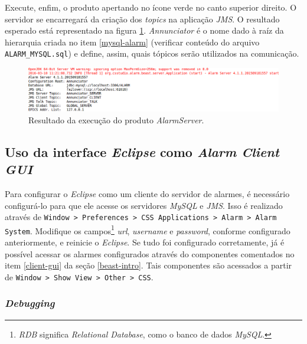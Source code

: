 \begin{enumerate}[i.]
\FloatBarrier

Execute, enfim, o produto apertando no ícone verde no canto superior direito.
O servidor se encarregará da criação dos \textit{topics} na aplicação
\textit{JMS}. O resultado esperado está representado na figura
\ref{fig:server-on}. \textit{Annunciator} é o nome dado à raíz da hierarquia
criada no item \ref{mysql-alarm} (verificar conteúdo do arquivo
\texttt{ALARM\_MYSQL.sql}) e define, assim, quais tópicos serão utilizados na
comunicação.

\FloatBarrier

\begin{figure}[h]

\centering
\includegraphics[scale=0.45]{image/alarmserver-on}
\caption {Resultado da execução do produto \textit{AlarmServer}.}
\label{fig:server-on} 
\end{figure}

\FloatBarrier

\end{enumerate}

\subsection{Uso da interface \textit{Eclipse} como \textit{Alarm Client GUI}}

Para configurar o \textit{Eclipse} como um cliente do servidor de alarmes, é
necessário configurá-lo para que ele acesse os servidores \textit{MySQL} e
\textit{JMS}. Isso é realizado através de \texttt{Window > Preferences > CSS
Applications > Alarm > Alarm System}. Modifique os campos\footnote{\textit{RDB}
significa \textit{Relational Database}, como o banco de dados \textit{MySQL}.}
\textit{url}, \textit{username} e \textit{password}, conforme configurado
anteriormente, e reinicie o \textit{Eclipse}. Se tudo foi configurado
corretamente, já é possível acessar os alarmes configurados através do
componentes comentados no item \ref{client-gui} da seção \ref{beast-intro}. Tais
componentes são acessados a partir de \texttt{Window > Show View > Other > CSS}.


\subsubsection {\textit{Debugging}} 

